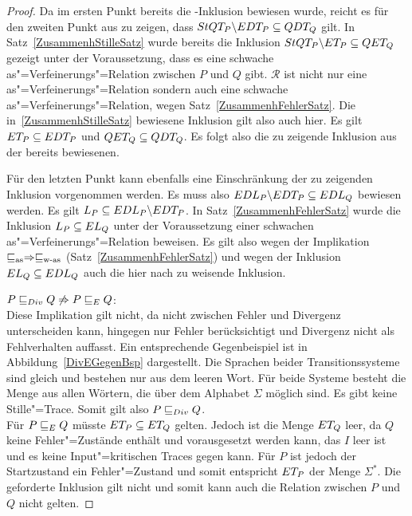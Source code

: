 \begin{proof}
  Da im ersten Punkt bereits die \EDT{}-Inklusion bewiesen wurde, reicht es
  für den zweiten Punkt aus zu zeigen, dass $StQT _P\backslash EDT _P
  \subseteq QDT _Q$ gilt. In Satz~\ref{ZusammenhStilleSatz} wurde bereits die
  Inklusion $StQT _P \backslash ET _P \subseteq QET _Q$ gezeigt unter der
  Voraussetzung, dass es eine schwache as"=Verfeinerungs"=Relation zwischen
  $P$ und $Q$ gibt. $\mathcal{R}$ ist nicht nur eine
  as"=Verfeinerungs"=Relation sondern auch eine schwache
  as"=Verfeinerungs"=Relation, wegen Satz~\ref{ZusammenhFehlerSatz}. Die
  in~\ref{ZusammenhStilleSatz} bewiesene Inklusion gilt also auch hier. Es gilt
  $ET _P \subseteq EDT _P$ und $QET _Q \subseteq QDT _Q$. Es folgt also die
  zu zeigende Inklusion aus der bereits bewiesenen.

  Für den letzten Punkt kann ebenfalls eine Einschränkung der zu zeigenden
  Inklusion vorgenommen werden. Es muss also $EDL _P \backslash EDT _P
  \subseteq EDL _Q$ bewiesen werden. Es gilt $L _P \subseteq EDL _P
  \backslash EDT _P$. In Satz~\ref{ZusammenhFehlerSatz} wurde die Inklusion
  $L _P\subseteq EL _Q$ unter der Voraussetzung einer schwachen
  as"=Verfeinerungs"=Relation beweisen. Es gilt also wegen der Implikation
  $\sqsubseteq _{\mathrm{as}} \Rightarrow \sqsubseteq _{\mathrm{w}\text{-}\mathrm{as}}$ (Satz~\ref{ZusammenhFehlerSatz}) und wegen der
  Inklusion $EL _Q \subseteq EDL _Q$ auch die hier nach zu weisende
  Inklusion.

  $P  \sqsubseteq  _{Div} Q \not\Rightarrow P  \sqsubseteq  _E Q$:\\
  Diese Implikation gilt nicht, da \DRel{} nicht zwischen Fehler und Divergenz
  unterscheiden kann, \ERel{} hingegen nur Fehler berücksichtigt und Divergenz
  nicht als Fehlverhalten auffasst. Ein entsprechende Gegenbeispiel ist in
  Abbildung~\ref{DivEGegenBsp} dargestellt. Die Sprachen beider
  Transitionssysteme sind gleich und bestehen nur aus dem leeren Wort. Für
  beide Systeme besteht die Menge \EDT{} aus allen Wörtern, die über dem
  Alphabet $\Sigma$ möglich sind. Es gibt keine Stille"=Trace. Somit gilt also
  $P  \sqsubseteq  _{Div} Q$.\\
  Für $P  \sqsubseteq  _E Q$ müsste $ET _P \subseteq ET _Q$ gelten. Jedoch ist die Menge
  $ET _Q$ leer, da $Q$ keine Fehler"=Zustände enthält und vorausgesetzt werden
  kann, das $I$ leer ist und es keine Input"=kritischen Traces gegen kann. Für
  $P$ ist jedoch der Startzustand ein Fehler"=Zustand und somit entspricht $ET
  _P$ der Menge $\Sigma ^*$. Die geforderte Inklusion gilt nicht und somit
  kann auch die Relation \ERel{} zwischen $P$ und $Q$ nicht gelten.


\end{proof}
